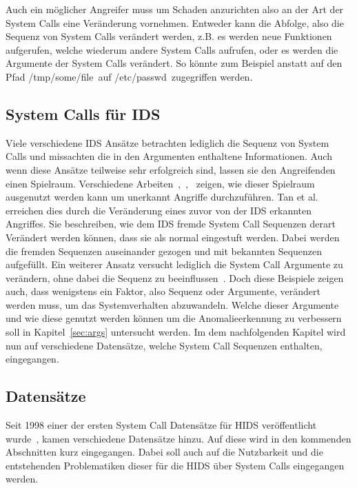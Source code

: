         Auch ein möglicher Angreifer muss um Schaden anzurichten also an der Art der System Calls eine Veränderung vornehmen.
        Entweder kann die Abfolge, also die Sequenz von System Calls verändert werden, z.B. es werden neue Funktionen aufgerufen, welche wiederum andere System Calls aufrufen,
        oder es werden die Argumente der System Calls verändert.
        So könnte zum Beispiel anstatt auf den Pfad \glqq /tmp/some/file\grqq \ auf \glqq /etc/passwd\grqq \ zugegriffen werden. 

        \subsection{System Calls für IDS}
        Viele verschiedene \ac{IDS} Ansätze betrachten lediglich die Sequenz von System Calls und missachten die in den Argumenten enthaltene Informationen.
            Auch wenn diese Ansätze teilweise sehr erfolgreich sind, lassen sie den Angreifenden einen Spielraum.
            Verschiedene Arbeiten~\cite{Syscallseqexploit1},~\cite{Syscallseqexploit2},~\cite{Syscallseqexploit3} zeigen, wie dieser Spielraum ausgenutzt werden kann um unerkannt Angriffe durchzuführen. 
            Tan et al.~\cite{Syscallseqexploit3} erreichen dies durch die Veränderung eines zuvor von \ac{der }IDS erkannten Angriffes.
            Sie beschreiben, wie \ac{dem }IDS fremde System Call Sequenzen derart Verändert werden können, dass sie als normal eingestuft werden.
            Dabei werden die fremden Sequenzen auseinander gezogen und mit bekannten Sequenzen aufgefüllt. 
            Ein weiterer Ansatz versucht lediglich die System Call Argumente zu verändern, ohne dabei die Sequenz zu beeinflussen~\cite{Syscallseqexploit1}.
            Doch diese Beispiele zeigen auch, dass wenigstens ein Faktor, also Sequenz oder Argumente, verändert werden muss, um das Systemverhalten abzuwandeln.
            Welche dieser Argumente und wie diese genutzt werden können um die Anomalieerkennung zu verbessern soll in Kapitel~\ref{sec:args} untersucht werden.
            Im dem nachfolgenden Kapitel wird nun auf verschiedene Datensätze, welche System Call Sequenzen enthalten, eingegangen.

        \subsection{Datensätze}\label{sec:Datensatz}
            Seit 1998 einer der ersten System Call Datensätze für HIDS veröffentlicht wurde~\cite{DARPA},
            kamen verschiedene Datensätze hinzu.
            Auf diese wird in den kommenden Abschnitten kurz eingegangen.
            Dabei soll auch auf die Nutzbarkeit und die entstehenden Problematiken dieser für die \ac{HIDS} über System Calls eingegangen werden.
